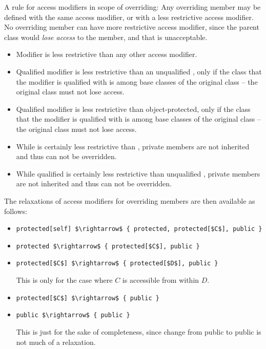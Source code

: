 A rule for access modifiers in scope of overriding: Any overriding member may be defined with the same access modifier, or with a less restrictive access modifier. No overriding member can have more restrictive access modifier, since the parent class would {\em lose access} to the member, and that is unacceptable. 
\begin{itemize}
\item Modifier  is less restrictive than any other access modifier. 
\item Qualified modifier  is less restrictive than an unqualified , only if the class that the modifier is qualified with is among base classes of the original class -- the original class must not lose access. 
\item Qualified modifier  is less restrictive than object-protected, only if the class that the modifier is qualified with is among base classes of the original class -- the original class must not lose access. 
\item While  is certainly less restrictive than , private members are not inherited and thus can not be overridden. 
\item While qualified  is certainly less restrictive than unqualified , private members are not inherited and thus can not be overridden. 
\end{itemize}
The relaxations of access modifiers for overriding members are then available as follows: 
\begin{itemize}
\item \lstinline!protected[self] $\rightarrow$ { protected, protected[$C$], public }!
\item \lstinline!protected $\rightarrow$ { protected[$C$], public }!
\item \lstinline!protected[$C$] $\rightarrow$ { protected[$D$], public }!

This is only for the case where $C$ is accessible from within $D$. 
\item \lstinline!protected[$C$] $\rightarrow$ { public }!
\item \lstinline!public $\rightarrow$ { public }!

This is just for the sake of completeness, since change from public to public is not much of a relaxation. 
\end{itemize}







